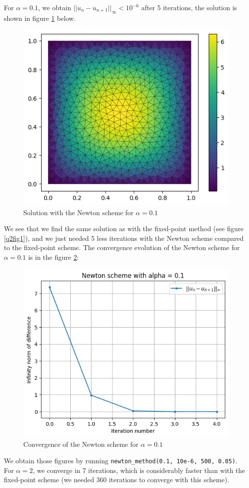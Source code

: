 \documentclass[11pt, a4paper, twoside]{article}
\begin{document}
For $\alpha = 0.1$, we obtain $||u_n -u_{n+1}||_\infty < 10^{-6}$ after 5 iterations, the solution is shown in figure \ref{q3fig1} below.
\begin{figure}[H]
\centering
\includegraphics[scale = 0.7]{../Figures/newt_sol_alpha0.1.png}
\caption{Solution with the Newton scheme for $\alpha=0.1$}
\label{q3fig1}
\end{figure}
We see that we find the same solution as with the fixed-point method (see figure \ref{q2fig1}), and we just needed 5 less iterations with the Newton scheme compared to the fixed-point scheme.
The convergence evolution of the Newton scheme for $\alpha=0.1$ is in the figure \ref{q3fig2}:
\begin{figure}[H]
\centering
\includegraphics[scale = 0.7]{../Figures/newt_conv_alpha0.1.png}
\caption{Convergence of the Newton scheme for $\alpha=0.1$}
\label{q3fig2}
\end{figure}
We obtain those figures by running \verb+newton_method(0.1, 10e-6, 500, 0.05)+.
For $\alpha=2$, we converge in 7 iterations, which is considerably faster than with the fixed-point scheme (we needed 360 iterations to converge with this scheme).
\end{document}
